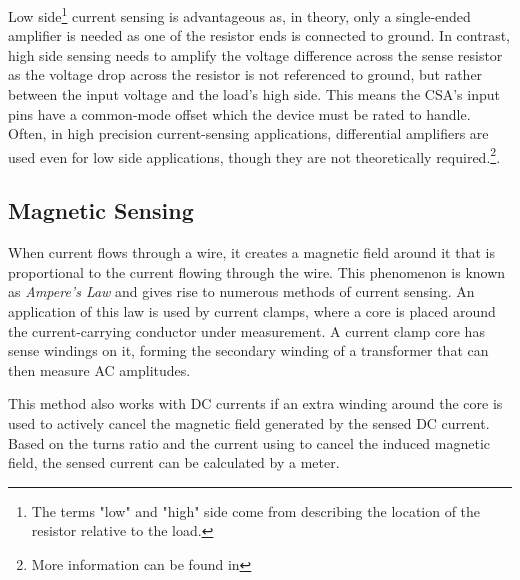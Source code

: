 \documentclass[main.tex]{subfiles}
\begin{document}
\noindent Low side\footnote{The terms "low" and "high" side come from describing the location of the resistor relative to the load.} current sensing is advantageous as, in theory, only a single-ended amplifier is needed as one of the resistor ends is connected to ground. In contrast, high side sensing needs to amplify the voltage difference across the sense resistor as the voltage drop across the resistor is not referenced to ground, but rather between the input voltage and the load's high side. This means the CSA's input pins have a common-mode offset which the device must be rated to handle. Often, in high precision current-sensing applications, differential amplifiers are used even for low side applications, though they are not theoretically required.\footnote{More information can be found in }. 

\subsection{Magnetic Sensing}
When current flows through a wire, it creates a magnetic field around it that is proportional to the current flowing through the wire. This phenomenon is known as \textit{Ampere's Law} and gives rise to numerous methods of current sensing. An application of this law is used by current clamps, where a core is placed around the current-carrying conductor under measurement. A current clamp core has sense windings on it, forming the secondary winding of a transformer that can then measure AC amplitudes. \newline

\newnoindentpara This method also works with DC currents if an extra winding around the core is used to actively cancel the magnetic field generated by the sensed DC current. Based on the turns ratio and the current using to cancel the induced magnetic field, the sensed current can be calculated by a meter.

\end{document}
